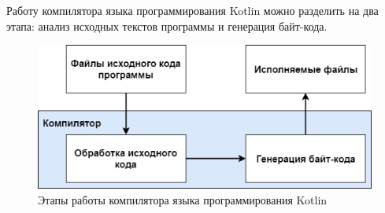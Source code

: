 Работу компилятора языка программирования Kotlin можно разделить на два этапа: анализ исходных текстов программы и генерация байт-кода. 

\begin{figure}[htbp]
    \centering
    \includegraphics[width=\textwidth]{resources/06/01_compiler_scheme.png}
    \caption{Этапы работы компилятора языка программирования Kotlin}
    \label{fig:compiler-scheme}
\end{figure}

